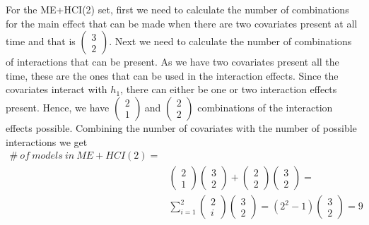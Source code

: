 For the ME+HCI(2) set, first we need to calculate the number of combinations for the main effect that can be made when there are two covariates present at all time and that is $\left( \begin{array}{c}
3 \\ 2 \end{array}\right)$. Next we need to calculate the number of combinations of interactions that can be present. As we have two covariates present all the time, these are the ones that can be used in the interaction effects. Since the covariates interact with $h_1$, there can either be one or two interaction effects present. Hence, we have $\left( \begin{array}{c}
2 \\ 
1 \end{array}
\right)\ $and $\left( \begin{array}{c}
2 \\ 
2 \end{array}
\right)$ combinations of the interaction effects possible. Combining the number of covariates with the number of possible interactions we get
\begin{equation*}
\begin{aligned}
\#\ of\ models\ in\ ME+HCI(2)=\\
& \left( \begin{array}{c}
2 \\ 
1 \end{array}
\right)\left( \begin{array}{c}
3 \\ 
2 \end{array}
\right)+\left( \begin{array}{c}
2 \\ 
2 \end{array}
\right)\left( \begin{array}{c}
3 \\ 
2 \end{array}
\right)=\\
&\sum^2_{i=1}{\left( \begin{array}{c}
2 \\ 
i \end{array}
\right)}\left( \begin{array}{c}
3 \\ 
2 \end{array}
\right)=\left(2^2-1\right)\left( \begin{array}{c}
3 \\ 
2 \end{array}
\right)=9

\end{aligned}
\end{equation*}
